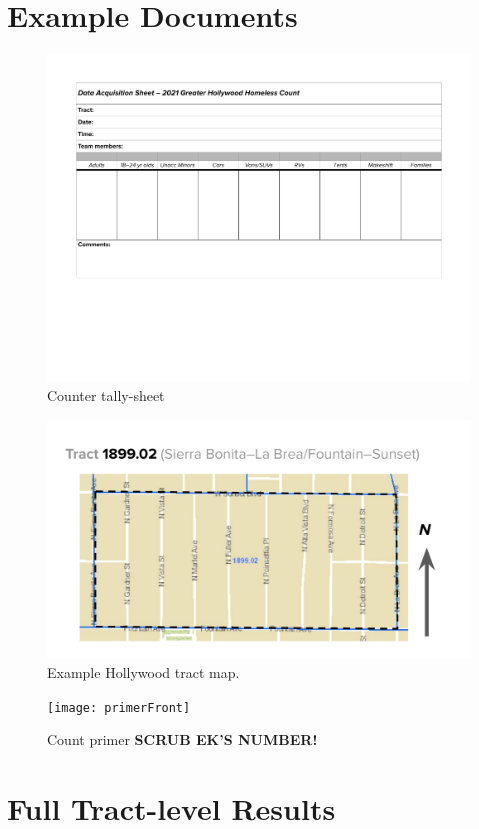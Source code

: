 \documentclass[11pt,twocolumn]{article}
\def\bfr{\bf\color{red}}
\begin{document}
\section{Example Documents}

\begin{figure}
	\centering
	\includegraphics[width =\linewidth]{Hollywood2021CountDataSheet}
	\caption{Counter tally-sheet}
\end{figure}

\begin{figure}
	\centering
	\includegraphics[width =\linewidth]{tractMap}
	\caption{Example Hollywood tract map.}
\end{figure}

\begin{figure}
	\centering
	\texttt{[image: primerFront]}
	\caption{Count primer {\bfr SCRUB EK'S NUMBER!}}
\end{figure}

\section{Full Tract-level Results}
\end{document}

